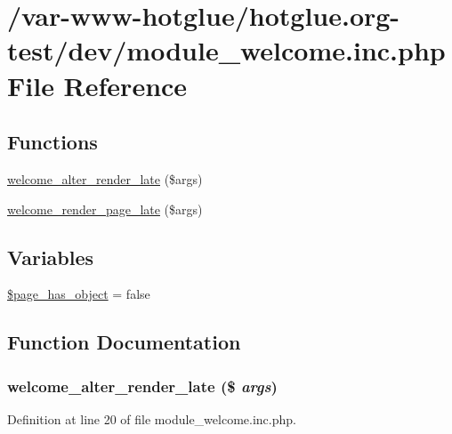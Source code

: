 \hypertarget{module__welcome_8inc_8php}{
\section{/var-\/www-\/hotglue/hotglue.org-\/test/dev/module\_\-welcome.inc.php File Reference}
\label{module__welcome_8inc_8php}
}
\subsection*{Functions}
\begin{DoxyCompactItemize}
\item 
\hyperlink{module__welcome_8inc_8php_a836aeacf569c4b5ef7021a5cc130daa6}{welcome\_\-alter\_\-render\_\-late} (\$args)
\item 
\hyperlink{module__welcome_8inc_8php_ad04e9602964c582c2927f8fc09f0a7be}{welcome\_\-render\_\-page\_\-late} (\$args)
\end{DoxyCompactItemize}
\subsection*{Variables}
\begin{DoxyCompactItemize}
\item 
\hyperlink{module__welcome_8inc_8php_a5718ac85d1688a52f2d4fedd9a6b4cdf}{\$page\_\-has\_\-object} = false
\end{DoxyCompactItemize}


\subsection{Function Documentation}
\hypertarget{module__welcome_8inc_8php_a836aeacf569c4b5ef7021a5cc130daa6}{
\subsubsection[{welcome\_\-alter\_\-render\_\-late}]{\setlength{\rightskip}{0pt plus 5cm}welcome\_\-alter\_\-render\_\-late (\$ {\em args})}}
\label{module__welcome_8inc_8php_a836aeacf569c4b5ef7021a5cc130daa6}


Definition at line 20 of file module\_\-welcome.inc.php.

